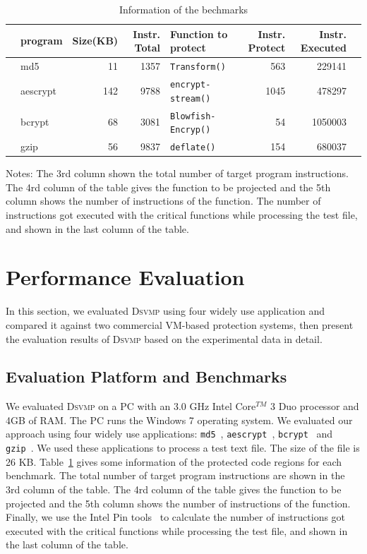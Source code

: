 \documentclass[times]{secauth}
\newcommand{\DSVMP}{\textsc{Dsvmp }}
\begin{document}
\begin{table}[!t]
\scriptsize
\begin{center}
\caption{Information of the bechmarks\label{tab:Tab.3}}
{\begin{tabular}{@{}rlrrlrrl@{}}\hline
   & \textbf{program} & \textbf{Size(KB)} & \textbf{Instr. Total} & \textbf{Function to protect} & \textbf{Instr. Protect} & \textbf{Instr. Executed} & \\
  \hline
   & md5 & 11 & 1357 & \texttt{Transform()} & 563 & 229141 & \\
   & aescrypt & 142 & 9788 &\texttt{encrypt-stream()} & 1045 & 478297 & \\
   & bcrypt & 68 & 3081 & \texttt{Blowfish-Encryp()} & 54 & 1050003 & \\
   & gzip & 56 & 9837 & \texttt{deflate()} & 154 & 680037 & \\
  \hline
\end{tabular}}{}
\end{center}
Notes: The 3rd column shown the total number of target program instructions.
The 4rd column of the table gives the function to be projected and the 5th column shows the number of instructions of the function. The number of instructions got executed with the critical functions while processing the test file, and shown in the last column of the table.
\end{table}


\section{Performance Evaluation\label{sec:p-eva}}
In this section, we evaluated \DSVMP using four widely use application
and compared it against two commercial VM-based protection systems,
then present the evaluation results of \DSVMP based on the experimental data in detail.


\subsection{Evaluation Platform and Benchmarks}
We evaluated \DSVMP on a PC with an 3.0 GHz Intel Core$^{TM}$ 3 Duo processor and 4GB of RAM.
The PC runs the Windows 7 operating system. We evaluated our approach using four widely use applications: \texttt{md5}~\cite{19md5}, \texttt{aescrypt}~\cite{20Aescrypt}, \texttt{bcrypt}~\cite{21bcrypt} and \texttt{gzip}~\cite{22gzip}.
We used these applications to process a test text file. The size of the file is 26 KB.
Table~\ref{tab:Tab.3} gives some information of the protected code regions for each benchmark.
The total number of target program instructions are shown in the 3rd column of the table.
The 4rd column of the table gives the function to be projected
and the 5th column shows the number of instructions of the function.
Finally, we use the Intel Pin tools~\cite{pin} to calculate the number of instructions got executed with the critical functions
while processing the test file, and shown in the last column of the table.
\end{document}
